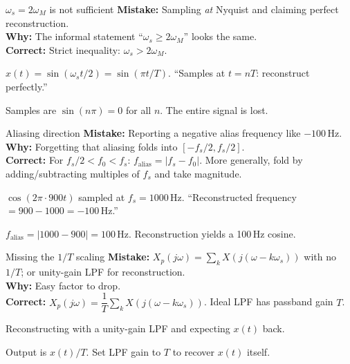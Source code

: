 \documentclass[11pt]{article}
\begin{document}
\begin{pitfallbox}{$\omega_s = 2\omega_M$ is not sufficient}
\textbf{Mistake:} Sampling \emph{at} Nyquist and claiming perfect reconstruction.\\
\textbf{Why:} The informal statement ``$\omega_s \ge 2\omega_M$'' looks the same.\\
\textbf{Correct:} Strict inequality: $\omega_s > 2\omega_M$.
\begin{wrongbox}
$x(t) = \sin(\omega_s t / 2) = \sin(\pi t / T)$. ``Samples at $t=nT$: reconstruct perfectly.''
\end{wrongbox}
\begin{rightbox}
Samples are $\sin(n\pi) = 0$ for all $n$. The entire signal is lost.
\end{rightbox}
\end{pitfallbox}

\begin{pitfallbox}{Aliasing direction}
\textbf{Mistake:} Reporting a negative alias frequency like $-100$\,Hz.\\
\textbf{Why:} Forgetting that aliasing folds into $[-f_s/2, f_s/2]$.\\
\textbf{Correct:} For $f_s/2 < f_0 < f_s$: $f_\text{alias} = |f_s - f_0|$. More generally, fold by adding/subtracting multiples of $f_s$ and take magnitude.
\begin{wrongbox}
$\cos(2\pi\cdot 900 t)$ sampled at $f_s = 1000$\,Hz. ``Reconstructed frequency $= 900 - 1000 = -100$\,Hz.''
\end{wrongbox}
\begin{rightbox}
$f_\text{alias} = |1000 - 900| = 100$\,Hz. Reconstruction yields a 100\,Hz cosine.
\end{rightbox}
\end{pitfallbox}

\begin{pitfallbox}{Missing the $1/T$ scaling}
\textbf{Mistake:} $X_p(j\omega) = \sum_k X(j(\omega-k\omega_s))$ with no $1/T$; or unity-gain LPF for reconstruction.\\
\textbf{Why:} Easy factor to drop.\\
\textbf{Correct:} $X_p(j\omega) = \dfrac{1}{T}\sum_k X(j(\omega - k\omega_s))$. Ideal LPF has passband gain $T$.
\begin{wrongbox}
Reconstructing with a unity-gain LPF and expecting $x(t)$ back.
\end{wrongbox}
\begin{rightbox}
Output is $x(t)/T$. Set LPF gain to $T$ to recover $x(t)$ itself.
\end{rightbox}
\end{pitfallbox}
\end{document}
